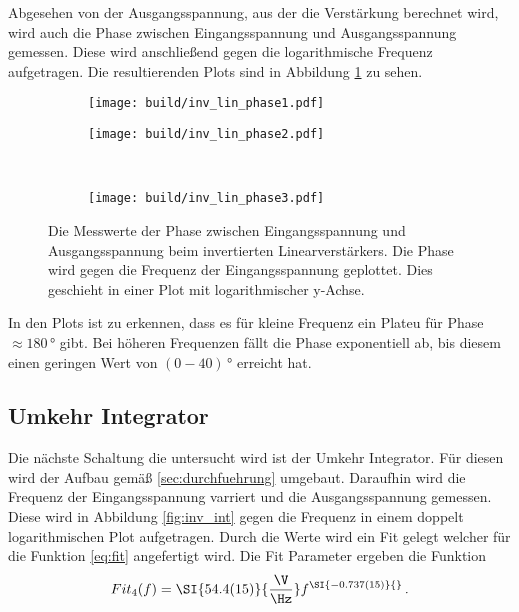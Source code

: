 Abgesehen von der Ausgangsspannung, aus der die Verstärkung berechnet wird, wird auch die Phase zwischen Eingangsspannung und Ausgangsspannung gemessen.
Diese wird anschließend gegen die logarithmische  Frequenz aufgetragen.
Die resultierenden Plots sind in Abbildung \ref{fig:phase} zu sehen.
\begin{figure}
    \centering
    \begin{subfigure}{0.49\linewidth}%
        \texttt{[image: build/inv\_lin\_phase1.pdf]}
    \end{subfigure}
    \hfill
    \begin{subfigure}{0.49\linewidth}%
        \texttt{[image: build/inv\_lin\_phase2.pdf]}
    \end{subfigure}\\
    \begin{subfigure}{0.49\linewidth}%
        \texttt{[image: build/inv\_lin\_phase3.pdf]}
    \end{subfigure}
    \caption{Die Messwerte der Phase zwischen Eingangsspannung und Ausgangsspannung beim invertierten Linearverstärkers. Die Phase wird gegen die Frequenz der Eingangsspannung geplottet.
    Dies geschieht in einer Plot mit logarithmischer y-Achse.}
    \label{fig:phase}
\end{figure}
In den Plots ist zu erkennen, dass es für kleine Frequenz ein Plateu für Phase $\approx 180\,\si{\degree}$ gibt.
Bei höheren Frequenzen fällt die Phase exponentiell ab, bis diesem einen geringen Wert von $(0-40)\,\si{\degree}$ erreicht hat.
\FloatBarrier
\subsection{Umkehr Integrator}
Die nächste Schaltung die untersucht wird ist der Umkehr Integrator.
Für diesen wird der Aufbau gemäß \ref{sec:durchfuehrung} umgebaut.
Daraufhin wird die Frequenz der Eingangsspannung varriert und die Ausgangsspannung gemessen.
Diese wird in Abbildung \ref{fig:inv_int} gegen die Frequenz in einem doppelt logarithmischen Plot aufgetragen.
Durch die Werte wird ein Fit gelegt welcher für die Funktion \eqref{eq:fit} angefertigt wird.
Die Fit Parameter ergeben die Funktion
\begin{align*}
    Fit_4(f) = \SI{54.4(15)}{\frac{\V}{\Hz}} f^{\SI{-0.737(15)}{}} \, .
\end{align*}

